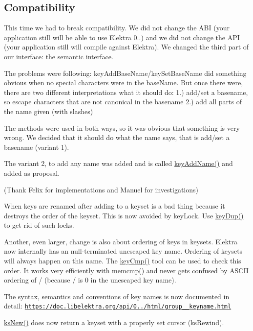 \subsection*{Compatibility}

This time we had to break compatibility. We did not change the A\+BI (your application still will be able to use Elektra 0..) and we did not change the A\+PI (your application still will compile against Elektra). We changed the third part of our interface\+: the semantic interface.

The problems were following\+: key\+Add\+Base\+Name/key\+Set\+Base\+Name did something obvious when no special characters were in the base\+Name. But once there were, there are two different interpretations what it should do\+: 1.) add/set a basename, so escape characters that are not canonical in the basename 2.) add all parts of the name given (with slashes)

The methods were used in both ways, so it was obvious that something is very wrong. We decided that it should do what the name says, that is add/set a basename (variant 1).

The variant 2, to add any name was added and is called \hyperlink{group__keyname_gaa70593a2c772c4b7bc33423b9b10a270}{key\+Add\+Name()} and added as proposal.

(Thank Felix for implementations and Manuel for investigations)

When keys are renamed after adding to a keyset is a bad thing because it destroys the order of the keyset. This is now avoided by key\+Lock. Use \hyperlink{group__key_gae6ec6a60cc4b8c1463fa08623d056ce3}{key\+Dup()} to get rid of such locks.

Another, even larger, change is also about ordering of keys in keysets. Elektra now internally has an null-\/terminated unescaped key name. Ordering of keysets will always happen on this name. The \hyperlink{group__keytest_gaf6e66e12fe04d535a5d1c8218ced803e}{key\+Cmp()} tool can be used to check this order. It works very efficiently with memcmp() and never gets confused by A\+S\+C\+II ordering of / (because / is 0 in the unescaped key name).

The syntax, semantics and conventions of key names is now documented in detail\+: \href{https://doc.libelektra.org/api/0.8.8/html/group__keyname.html}{\tt https\+://doc.\+libelektra.\+org/api/0../html/group\+\_\+\+\_\+keyname.\+html}

\hyperlink{group__keyset_ga671e1aaee3ae9dc13b4834a4ddbd2c3c}{ks\+New()} does now return a keyset with a properly set cursor (ks\+Rewind).

